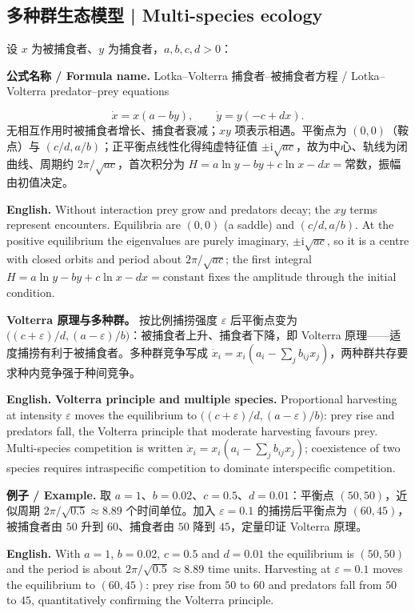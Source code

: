 \documentclass[UTF8,11pt,a4paper]{ctexart}
\newcommand{\EN}[1]{\par\noindent\textbf{English.} #1\par}
\newcommand{\FORMULA}[2]{\par\noindent\textbf{公式名称 / Formula name.} #1 / #2\par}
\newcommand{\EX}[2]{\par\noindent\textbf{例子 / Example.} #1\par\EN{#2}}
\begin{document}
\subsection{多种群生态模型 | Multi-species ecology}
设 $x$ 为被捕食者、$y$ 为捕食者，$a,b,c,d>0$：
\FORMULA{Lotka--Volterra 捕食者--被捕食者方程}{Lotka--Volterra predator--prey equations}
\[
\dot x=x(a-by),\qquad \dot y=y(-c+dx).
\]
无相互作用时被捕食者增长、捕食者衰减；$xy$ 项表示相遇。平衡点为 $(0,0)$（鞍点）与 $(c/d,a/b)$；正平衡点线性化得纯虚特征值 $\pm\mathrm i\sqrt{ac}$，故为中心、轨线为闭曲线、周期约 $2\pi/\sqrt{ac}$，首次积分为 $H=a\ln y-by+c\ln x-dx=\text{常数}$，振幅由初值决定。
\EN{Without interaction prey grow and predators decay; the $xy$ terms represent encounters. Equilibria are $(0,0)$ (a saddle) and $(c/d,a/b)$. At the positive equilibrium the eigenvalues are purely imaginary, $\pm\mathrm i\sqrt{ac}$, so it is a centre with closed orbits and period about $2\pi/\sqrt{ac}$; the first integral $H=a\ln y-by+c\ln x-dx=\text{constant}$ fixes the amplitude through the initial condition.}
\noindent\textbf{Volterra 原理与多种群。} 按比例捕捞强度 $\varepsilon$ 后平衡点变为 $\big((c+\varepsilon)/d,(a-\varepsilon)/b\big)$：被捕食者上升、捕食者下降，即 Volterra 原理——适度捕捞有利于被捕食者。多种群竞争写成 $\dot x_i=x_i(a_i-\sum_jb_{ij}x_j)$，两种群共存要求种内竞争强于种间竞争。
\EN{\textbf{Volterra principle and multiple species.} Proportional harvesting at intensity $\varepsilon$ moves the equilibrium to $\big((c+\varepsilon)/d,(a-\varepsilon)/b\big)$: prey rise and predators fall, the Volterra principle that moderate harvesting favours prey. Multi-species competition is written $\dot x_i=x_i(a_i-\sum_jb_{ij}x_j)$; coexistence of two species requires intraspecific competition to dominate interspecific competition.}
\EX{取 $a=1$、$b=0.02$、$c=0.5$、$d=0.01$：平衡点 $(50,50)$，近似周期 $2\pi/\sqrt{0.5}\approx8.89$ 个时间单位。加入 $\varepsilon=0.1$ 的捕捞后平衡点为 $(60,45)$，被捕食者由 $50$ 升到 $60$、捕食者由 $50$ 降到 $45$，定量印证 Volterra 原理。}{With $a=1$, $b=0.02$, $c=0.5$ and $d=0.01$ the equilibrium is $(50,50)$ and the period is about $2\pi/\sqrt{0.5}\approx8.89$ time units. Harvesting at $\varepsilon=0.1$ moves the equilibrium to $(60,45)$: prey rise from $50$ to $60$ and predators fall from $50$ to $45$, quantitatively confirming the Volterra principle.}
\end{document}
